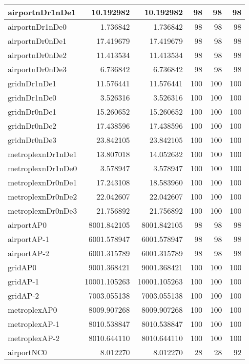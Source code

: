 \begin{longtable}{|l|r|r|r|r|r|}
\endlastfoot
airportnDr1nDe1 & 10.192982 & 10.192982 & 98 & 98 & 98 \\ \hline
airportnDr1nDe0 & 1.736842 & 1.736842 & 98 & 98 & 98 \\ \hline
airportnDr0nDe1 & 17.419679 & 17.419679 & 98 & 98 & 98 \\ \hline
airportnDr0nDe2 & 11.413534 & 11.413534 & 98 & 98 & 98 \\ \hline
airportnDr0nDe3 & 6.736842 & 6.736842 & 98 & 98 & 98 \\ \hline
gridnDr1nDe1 & 11.576441 & 11.576441 & 100 & 100 & 100 \\ \hline
gridnDr1nDe0 & 3.526316 & 3.526316 & 100 & 100 & 100 \\ \hline
gridnDr0nDe1 & 15.260652 & 15.260652 & 100 & 100 & 100 \\ \hline
gridnDr0nDe2 & 17.438596 & 17.438596 & 100 & 100 & 100 \\ \hline
gridnDr0nDe3 & 23.842105 & 23.842105 & 100 & 100 & 100 \\ \hline
metroplexnDr1nDe1 & 13.807018 & 14.052632 & 100 & 100 & 100 \\ \hline
metroplexnDr1nDe0 & 3.578947 & 3.578947 & 100 & 100 & 100 \\ \hline
metroplexnDr0nDe1 & 17.243108 & 18.583960 & 100 & 100 & 100 \\ \hline
metroplexnDr0nDe2 & 22.042607 & 22.042607 & 100 & 100 & 100 \\ \hline
metroplexnDr0nDe3 & 21.756892 & 21.756892 & 100 & 100 & 100 \\ \hline
airportAP0 & 8001.842105 & 8001.842105 & 98 & 98 & 98 \\ \hline
airportAP-1 & 6001.578947 & 6001.578947 & 98 & 98 & 98 \\ \hline
airportAP-2 & 6001.315789 & 6001.315789 & 98 & 98 & 98 \\ \hline
gridAP0 & 9001.368421 & 9001.368421 & 100 & 100 & 100 \\ \hline
gridAP-1 & 10001.105263 & 10001.105263 & 100 & 100 & 100 \\ \hline
gridAP-2 & 7003.055138 & 7003.055138 & 100 & 100 & 100 \\ \hline
metroplexAP0 & 8009.907268 & 8009.907268 & 100 & 100 & 100 \\ \hline
metroplexAP-1 & 8010.538847 & 8010.538847 & 100 & 100 & 100 \\ \hline
metroplexAP-2 & 8010.644110 & 8010.644110 & 100 & 100 & 100 \\ \hline
airportNC0 & 8.012270 & 8.012270 & 28 & 28 & 92 \\ \hline

\end{longtable}

